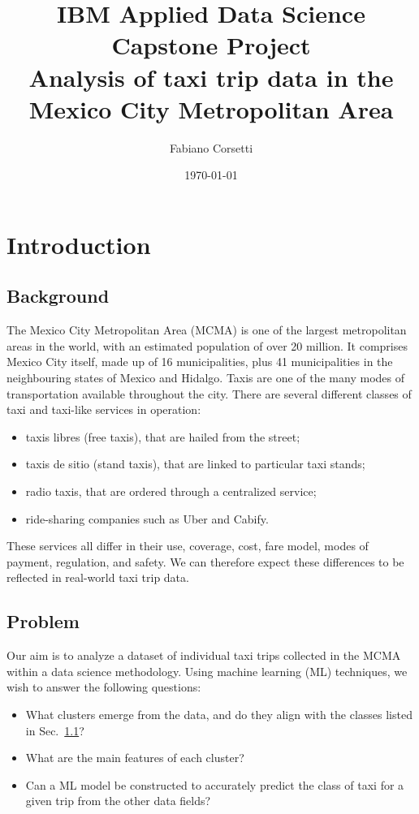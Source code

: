 \documentclass[10pt, a4paper, onecolumn]{article}
\begin{document}
\title{{\large IBM Applied Data Science Capstone Project}\\Analysis of taxi trip data in the Mexico City Metropolitan Area}
\author{Fabiano Corsetti}
\date{\today}

\maketitle

\section{Introduction}

\subsection{Background} \label{sec:intro:background}

The Mexico City Metropolitan Area (MCMA) is one of the largest metropolitan areas in the world, with an estimated population of over 20 million. It comprises Mexico City itself, made up of 16 municipalities, plus 41 municipalities in the neighbouring states of Mexico and Hidalgo. Taxis are one of the many modes of transportation available throughout the city. There are several different classes of taxi and taxi-like services in operation:
\begin{itemize}
\item taxis libres (free taxis), that are hailed from the street;
\item taxis de sitio (stand taxis), that are linked to particular taxi stands;
\item radio taxis, that are ordered through a centralized service;
\item ride-sharing companies such as Uber and Cabify.
\end{itemize}
These services all differ in their use, coverage, cost, fare model, modes of payment, regulation, and safety. We can therefore expect these differences to be reflected in real-world taxi trip data.

\subsection{Problem}

Our aim is to analyze a dataset of individual taxi trips collected in the MCMA within a data science methodology. Using machine learning (ML) techniques, we wish to answer the following questions:
\begin{itemize}
\item What clusters emerge from the data, and do they align with the classes listed in Sec.~\ref{sec:intro:background}?
\item What are the main features of each cluster?
\item Can a ML model be constructed to accurately predict the class of taxi for a given trip from the other data fields?
\end{itemize}
\end{document}
